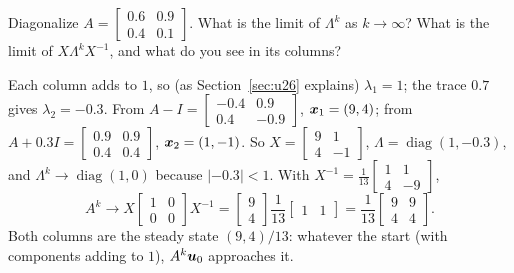 \begin{exercise}\label{exr:u24-limit}
Diagonalize $A=\left[\begin{smallmatrix} 0.6&0.9\\ 0.4&0.1\end{smallmatrix}\right]$. What
is the limit of $\Lambda^{k}$ as $k\to\infty$? What is the limit of $X\Lambda^{k}X^{-1}$,
and what do you see in its columns?
\end{exercise}
\begin{solution}
Each column adds to $1$, so (as Section~\ref{sec:u26} explains) $\lambda_1=1$; the trace
$0.7$ gives $\lambda_2=-0.3$. From
$A-I=\left[\begin{smallmatrix} -0.4&0.9\\ 0.4&-0.9\end{smallmatrix}\right]$,
$\boldsymbol{x}_1=(9,4)$; from
$A+0.3I=\left[\begin{smallmatrix} 0.9&0.9\\ 0.4&0.4\end{smallmatrix}\right]$,
$\boldsymbol{x}_2=(1,-1)$. So
$X=\left[\begin{smallmatrix} 9&1\\ 4&-1\end{smallmatrix}\right]$,
$\Lambda=\operatorname{diag}(1,-0.3)$, and $\Lambda^{k}\to\operatorname{diag}(1,0)$ because
$|-0.3|<1$. With $X^{-1}=\tfrac1{13}\left[\begin{smallmatrix} 1&1\\ 4&-9\end{smallmatrix}\right]$,
\[
  A^{k}\to X\begin{bmatrix} 1&0\\ 0&0\end{bmatrix}X^{-1}
  =\begin{bmatrix} 9\\ 4\end{bmatrix}\frac{1}{13}\begin{bmatrix} 1&1\end{bmatrix}
  =\frac1{13}\begin{bmatrix} 9&9\\ 4&4\end{bmatrix}.
\]
Both columns are the steady state $(9,4)/13$: whatever the start (with components adding to
$1$), $A^{k}\boldsymbol{u}_0$ approaches it.
\end{solution}

